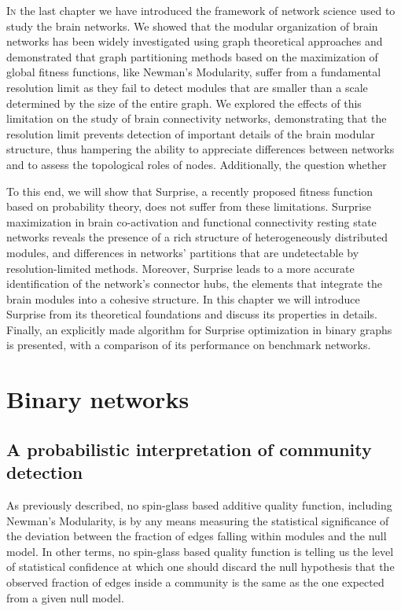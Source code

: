 \bigbreak

\lettrine{I}{n} the last chapter we have introduced the framework of network science used to study the brain networks. We showed that the modular organization of brain networks has been widely investigated using graph theoretical approaches and demonstrated that graph partitioning methods based on the maximization of global fitness functions, like Newman's Modularity, suffer from a fundamental resolution limit as they fail to detect modules that are smaller than a scale determined by the size of the entire graph.
We explored the effects of this limitation on the study of brain connectivity networks, demonstrating that the resolution limit prevents detection of important details of the brain modular structure, thus hampering the ability to appreciate differences between networks and to assess the topological roles of nodes.
Additionally, the question whether 

To this end, we will show that Surprise, a recently proposed fitness function based on probability theory, does not suffer from these limitations.
Surprise maximization in brain co-activation and functional connectivity resting state networks reveals the presence of a rich structure of heterogeneously distributed modules, and differences in networks' partitions that are undetectable by resolution-limited methods.
Moreover, Surprise leads to a more accurate identification of the network's connector hubs, the elements that integrate the brain modules into a cohesive structure. 
In this chapter we will introduce Surprise from its theoretical foundations and discuss its properties in details. Finally, an explicitly made algorithm for Surprise optimization in binary graphs is presented, with a comparison of its performance on benchmark networks.

\section{Binary networks}
\subsection{A probabilistic interpretation of community detection}\label{sec:probability_clustering}
As previously described, no spin-glass based additive quality function, including Newman's Modularity, is by any means measuring the statistical significance of the deviation between the fraction of edges falling within modules and the null model.
In other terms, no spin-glass based quality function is telling us the level of statistical confidence at which one should discard the null hypothesis that the observed fraction of edges inside a community is the same as the one expected from a given null model.

